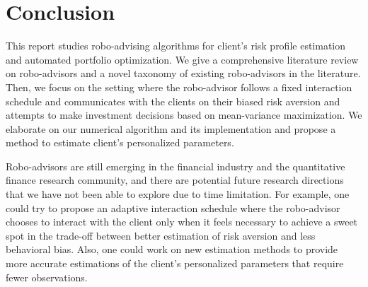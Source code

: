 \chapter{Conclusion}\label{sec:conclusion}

This report studies robo-advising algorithms for client's risk profile estimation and automated portfolio optimization. We give a comprehensive literature review on robo-advisors and a novel taxonomy of existing robo-advisors in the literature. Then, we focus on the setting where the robo-advisor follows a fixed interaction schedule and communicates with the clients on their biased risk aversion and attempts to make investment decisions based on mean-variance maximization. We elaborate on our numerical algorithm and its implementation and propose a method to estimate client's personalized parameters.

Robo-advisors are still emerging in the financial industry and the quantitative finance research community, and there are potential future research directions that we have not been able to explore due to time limitation. For example, one could try to propose an adaptive interaction schedule where the robo-advisor chooses to interact with the client only when it feels necessary to achieve a sweet spot in the trade-off between better estimation of risk aversion and less behavioral bias. Also, one could work on new estimation methods to provide more accurate estimations of the client's personalized parameters that require fewer observations.